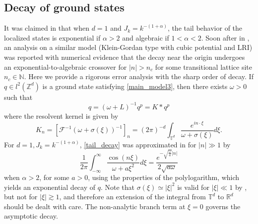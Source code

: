 \documentclass{article}
\numberwithin{equation}{section}
\begin{document}
\subsection{Decay of ground states}\label{decay3}
It was claimed in \cite[Section 3]{gaididei1997effects} that when $d=1$ and $J_k = k^{-(1+\alpha)}$, the tail behavior of the localized states is exponential if $\alpha > 2$ and algebraic if $1 < \alpha < 2$. Soon after in \cite{flach1998breathers}, an analysis on a similar model (Klein-Gordan type with cubic potential and LRI) was reported with numerical evidence that the decay near the origin undergoes an exponential-to-algebraic crossover for $|n| > n_c$ for some transitional lattice site $n_c \in \mathbb{N}$. Here we provide a rigorous error analysis with the sharp order of decay. If $q \in l^2(\mathbb{Z}^d)$ is a ground state satisfying \eqref{main_model3}, then there exists $\omega > 0$ such that
\begin{equation}\label{ground_state}
    q = (\omega+L)^{-1}q^p = K \ast q^p
\end{equation}
where the resolvent kernel is given by
\begin{equation}\label{tail_decay}
    K_n = [\mathcal{F}^{-1} (\omega + \sigma(\xi))^{-1}]_n = (2\pi)^{-d} \int_{\mathbb{T}^d} \frac{e^{i n \cdot \xi}}{\omega + \sigma(\xi)}d\xi. 
\end{equation}
For $d=1, J_k = k^{-(1+\alpha)}$, \eqref{tail_decay} was approximated in \cite{gaididei1997effects} for $|n| \gg 1$ by
\begin{equation*}
    \frac{1}{2\pi}\int_{-\infty}^{\infty} \frac{\cos (n \xi)}{\omega + a\xi^2} d\xi = \frac{e^{-\sqrt{\frac{\omega}{a}}|n|}}{2\sqrt{a \omega}}
\end{equation*}
when $\alpha > 2$, for some $a>0$, using the properties of the polylogarithm, which yields an exponential decay of $q$. Note that $\sigma(\xi) \simeq |\xi|^2$ is valid for $|\xi| \ll 1$ by , but not for $|\xi| \gtrsim 1$, and therefore an extension of the integral from $\mathbb{T}^d$ to $\mathbb{R}^d$ should be dealt with care. The non-analytic branch term at $\xi = 0$ governs the asymptotic decay.
\end{document}
